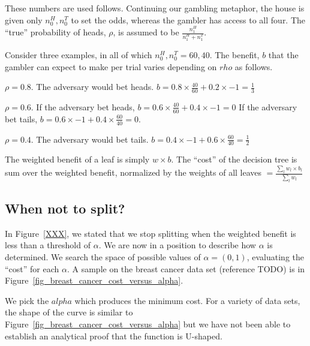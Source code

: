 These numbers are used follows. Continuing our gambling metaphor,
the house is given only \(n^H_0, n^T_0\) to set the odds, whereas the gambler
has access to all four.
The ``true'' probability of heads, \(\rho\), is assumed to be 
\(\frac{n^H_1}{n^H_1+ n^T_1}\). 

Consider three examples, in all of which \(n^H_0, n^T_0 = 60, 40\). 
The benefit, \(b\) that the gambler can expect to make per trial varies
depending on \(rho\) as follows.
\be
\item \(\rho = 0.8\). The adversary would bet heads.
\(b = 0.8 \times \frac{40}{60} + 0.2 \times -1 = \frac{1}{3}\)
\item \(\rho = 0.6\). If the adversary bet heads, 
\(b = 0.6 \times \frac{40}{60} + 0.4 \times -1 = 0\)
If the adversary bet tails, 
\(b = 0.6 \times -1 + 0.4 \times \frac{60}{40} = 0\).
\item \(\rho = 0.4\). The adversary would bet tails.
\(b = 0.4 \times -1 + 0.6 \times \frac{60}{40} = \frac{1}{2}\) 
\ee

The weighted benefit of a leaf is simply \(w \times b\).
The ``cost'' of the decision tree is sum over the 
weighted benefit, normalized by the weights of all leaves 
\(= \frac{\sum_l w_l \times b_l}{\sum_l w_l}\)

\subsection{When not to split?}

In Figure~\ref{XXX}, we stated that we stop splitting when the weighted benefit
is less than a threshold of \(\alpha\). We are now in a position to describe how
\(\alpha\) is determined. We search the space of possible values of \(\alpha =
(0, 1)\), evaluating the ``cost'' for each \(\alpha\). A sample on the breast
cancer data set (reference TODO) is in
Figure~\ref{fig_breast_cancer_cost_versus_alpha}.

We pick the \(alpha\) which produces the minimum cost. For a variety of data
sets, the shape of the curve is similar to 
Figure~\ref{fig_breast_cancer_cost_versus_alpha} but we have not been able to
establish an analytical proof that the function is U-shaped.




